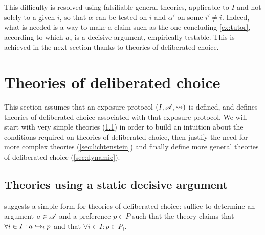\documentclass[version=last, pagesize, twoside=off, bibliography=totoc, DIV=calc, fontsize=12pt, a4paper, french, english]{scrartcl}
\begin{document}
This difficulty is resolved using falsifiable general theories, applicable to $I$ and not solely to a given $i$, so that $\alpha$ can be tested on $i$ and $\alpha'$ on some $i' ≠ i$. Indeed, what is needed is a way to make a claim such as the one concluding \cref{ex:tutor}, according to which $a_e$ is a decisive argument, empirically testable. This is achieved in the next section thanks to theories of deliberated choice.

\section{Theories of deliberated choice}
This section assumes that an exposure protocol $(I, \mathscr{A}, {\leadsto})$ is defined, and defines theories of deliberated choice associated with that exposure protocol. We will start with very simple theories (\cref{sec:static}) in order to build an intuition about the conditions required on theories of deliberated choice, then justify the need for more complex theories (\cref{sec:lichtenstein}) and finally define more general theories of deliberated choice (\cref{sec:dynamic}).

\subsection{Theories using a static decisive argument}
\label{sec:static}
 suggests a simple form for theories of deliberated choice: suffice to determine an argument $\ar \in \allargs$ and a preference $p \in P$ such that the theory claims that $\forall i \in I: \ar \ileadstost p$ and that $\forall i \in I: p \in P_i$.
\end{document}
